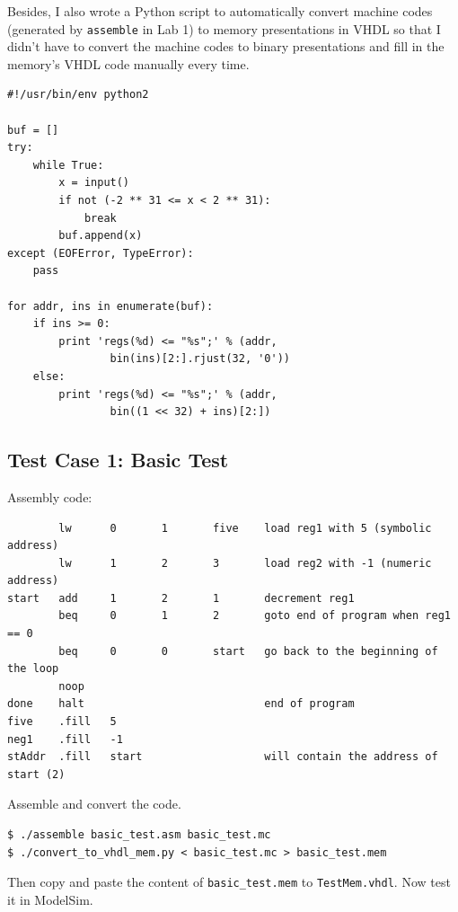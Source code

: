 \documentclass[a4paper]{article}
\begin{document}
Besides, I also wrote a Python script to automatically convert machine codes (generated by \verb|assemble| in Lab 1) to
memory presentations in VHDL so that I didn't have to convert the machine codes to binary presentations and fill in the
memory's VHDL code manually every time.

\begin{verbatim}
#!/usr/bin/env python2

buf = []
try:
    while True:
        x = input()
        if not (-2 ** 31 <= x < 2 ** 31):
            break
        buf.append(x)
except (EOFError, TypeError):
    pass

for addr, ins in enumerate(buf):
    if ins >= 0:
        print 'regs(%d) <= "%s";' % (addr,
                bin(ins)[2:].rjust(32, '0'))
    else:
        print 'regs(%d) <= "%s";' % (addr,
                bin((1 << 32) + ins)[2:])
\end{verbatim}

\subsection{Test Case 1: Basic Test}

Assembly code:

\begin{verbatim}
        lw      0       1       five    load reg1 with 5 (symbolic address)
        lw      1       2       3       load reg2 with -1 (numeric address)
start   add     1       2       1       decrement reg1
        beq     0       1       2       goto end of program when reg1 == 0
        beq     0       0       start   go back to the beginning of the loop
        noop
done    halt                            end of program
five    .fill   5
neg1    .fill   -1
stAddr  .fill   start                   will contain the address of start (2)
\end{verbatim}

Assemble and convert the code.

\begin{verbatim}
$ ./assemble basic_test.asm basic_test.mc
$ ./convert_to_vhdl_mem.py < basic_test.mc > basic_test.mem
\end{verbatim}

Then copy and paste the content of \verb|basic_test.mem| to \verb|TestMem.vhdl|. Now test it in ModelSim.
\end{document}
